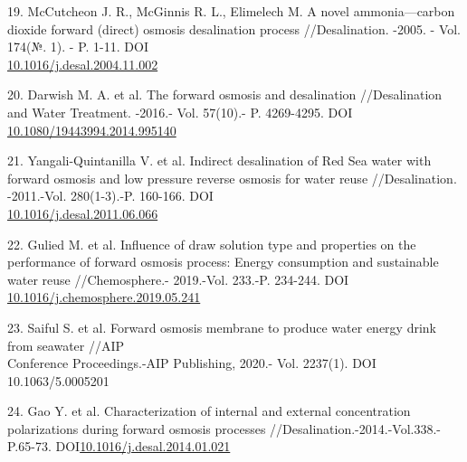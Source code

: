 \begin{references}
19. McCutcheon J. R., McGinnis R. L., Elimelech M. A novel
ammonia---carbon dioxide forward (direct) osmosis desalination process
//Desalination. -2005. - Vol. 174(№. 1). - P. 1-11. DOI
\\\href{http://dx.doi.org/10.1016/j.desal.2004.11.002}{10.1016/j.desal.2004.11.002}

20. Darwish M. A. et al. The forward osmosis and desalination
//Desalination and Water Treatment. -2016.- Vol. 57(10).- P.
4269-4295. DOI
\href{http://dx.doi.org/10.1080/19443994.2014.995140}{10.1080/19443994.2014.995140}

21. Yangali-Quintanilla V. et al. Indirect desalination of Red Sea water
with forward osmosis and low pressure reverse osmosis for water reuse
//Desalination. -2011.-Vol. 280(1-3).-P. 160-166. DOI
\\\href{http://dx.doi.org/10.1016/j.desal.2011.06.066}{10.1016/j.desal.2011.06.066}

22. Gulied M. et al. Influence of draw solution type and properties on the
performance of forward osmosis process: Energy consumption and
sustainable water reuse //Chemosphere.- 2019.-Vol. 233.-P. 234-244.
DOI
\href{http://dx.doi.org/10.1016/j.chemosphere.2019.05.241}{10.1016/j.chemosphere.2019.05.241}

23. Saiful S. et al. Forward osmosis membrane to produce water energy
drink from seawater //AIP \\Conference Proceedings.-AIP Publishing,
2020.- Vol. 2237(1). DOI 10.1063/5.0005201

24. Gao Y. et al. Characterization of internal and external concentration
polarizations during forward osmosis processes
//Desalination.-2014.-Vol.338.- P.65-73.
DOI\href{http://dx.doi.org/10.1016/j.desal.2014.01.021}{10.1016/j.desal.2014.01.021}
\end{references}

